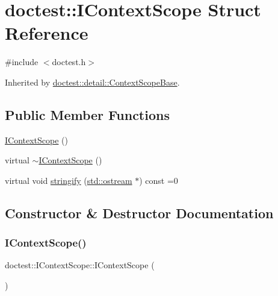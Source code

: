 \hypertarget{structdoctest_1_1_i_context_scope}{}\section{doctest\+:\+:I\+Context\+Scope Struct Reference}
\label{structdoctest_1_1_i_context_scope}


{\ttfamily \#include $<$doctest.\+h$>$}



Inherited by \mbox{\hyperlink{classdoctest_1_1detail_1_1_context_scope_base}{doctest\+::detail\+::\+Context\+Scope\+Base}}.

\subsection*{Public Member Functions}
\begin{DoxyCompactItemize}
\item 
\mbox{\hyperlink{structdoctest_1_1_i_context_scope_a067a2f9a9e53b010eb7b0a2ab88c76fd}{I\+Context\+Scope}} ()
\item 
virtual \mbox{\hyperlink{structdoctest_1_1_i_context_scope_aa99357c233d6a040451628bc6a6c6c2e}{$\sim$\+I\+Context\+Scope}} ()
\item 
virtual void \mbox{\hyperlink{structdoctest_1_1_i_context_scope_affbf0f9bf8107a4a8a805d237288141d}{stringify}} (\mbox{\hyperlink{doctest_8h_a116af65cb5e924b33ad9d9ecd7a783f3}{std\+::ostream}} $\ast$) const =0
\end{DoxyCompactItemize}


\subsection{Constructor \& Destructor Documentation}
\mbox{\label{structdoctest_1_1_i_context_scope_a067a2f9a9e53b010eb7b0a2ab88c76fd}} 
\subsubsection{\texorpdfstring{I\+Context\+Scope()}{IContextScope()}}
{\footnotesize\ttfamily doctest\+::\+I\+Context\+Scope\+::\+I\+Context\+Scope (\begin{DoxyParamCaption}{ }\end{DoxyParamCaption})}

